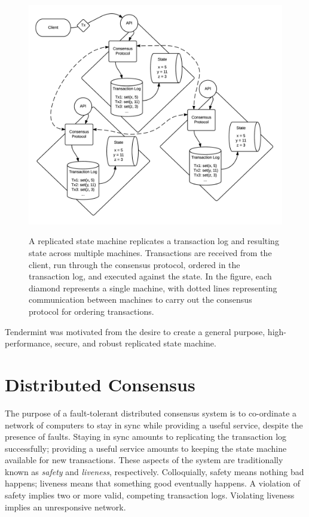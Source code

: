 \begin{figure}[]
	\includegraphics[width=\linewidth,height=\textheight,keepaspectratio]{figures/diagrams/state_machine.png}
    	\centering
	\label{fig:replicated_state_machine}
	\caption[Overview of replicated state machine architecture]{
A replicated state machine replicates a transaction log and resulting state across multiple machines. 
Transactions are received from the client, 
run through the consensus protocol, 
ordered in the transaction log,
and executed against the state. 
In the figure, each diamond represents a single machine, 
with dotted lines representing communication between machines to carry out the consensus protocol for ordering transactions.}
\end{figure}

Tendermint was motivated from the desire to create a general purpose, high-performance, secure, and robust replicated state machine.

\section{Distributed Consensus}

The purpose of a fault-tolerant distributed consensus system is to co-ordinate a network of computers to 
stay in sync while providing a useful service, despite the presence of faults.
Staying in sync amounts to replicating the transaction log successfully; 
providing a useful service amounts to keeping the state machine available for new transactions.
These aspects of the system are traditionally known as \emph{safety} and \emph{liveness}, respectively.
Colloquially, safety means nothing bad happens; liveness means that something good eventually happens.
A violation of safety implies two or more valid, competing transaction logs.
Violating liveness implies an unresponsive network.

